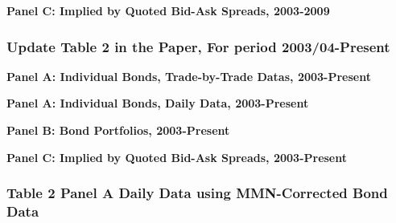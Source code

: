 \documentclass{article}
\newcommand*{\PathToOutput}{../output/}%
\begin{document}
\begin{table}[hbt!]
\centering
\textbf{\small Panel C: Implied by Quoted Bid-Ask Spreads, 2003-2009}
\small %
\renewcommand{\arraystretch}{0.92} %

\label{table:table2_panelC_paper}
\end{table}
\FloatBarrier %


\subsubsection{Update Table 2 in the Paper, For period 2003/04-Present}

\begin{table}[hbt!]
\centering
\textbf{\small Panel A: Individual Bonds, Trade-by-Trade Datas, 2003-Present}
\resizebox{\textwidth}{!}{%
    
}
\label{table:table2_panelA_trade_by_trade_new}
\end{table}
\FloatBarrier %

\begin{table}[hbt!]
\centering
\textbf{\small Panel A: Individual Bonds, Daily Data, 2003-Present}
\resizebox{\textwidth}{!}{%
    
}
\label{table:table2_panelA_daily_new}
\end{table}
\FloatBarrier %

\begin{table}[hbt!]
\centering
\textbf{\small Panel B: Bond Portfolios, 2003-Present}
\resizebox{\textwidth}{!}{%
    
}
\label{table:table2_panelB_new}
\end{table}
\FloatBarrier %

\begin{table}[hbt!]
\centering
\textbf{\small Panel C: Implied by Quoted Bid-Ask Spreads, 2003-Present}
\resizebox{\textwidth}{!}{%
    
}
\label{table:table2_panelC_new}
\end{table}
\FloatBarrier %


\subsubsection{Table 2 Panel A Daily Data using MMN-Corrected Bond Data}
\end{document}
